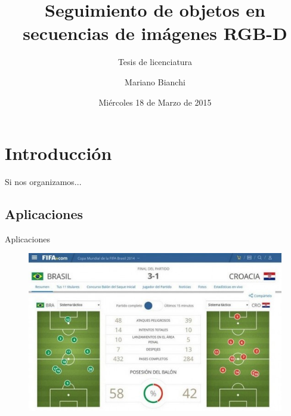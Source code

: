 \documentclass[]{beamer}
\title{Seguimiento de objetos en secuencias de imágenes RGB-D}
\subtitle{Tesis de licenciatura}
\institute{Facultad de Ciencias Exactas y Naturales}
\date[18/03/15]{Miércoles 18 de Marzo de 2015}
\author{Mariano Bianchi}
\begin{document}
\maketitle



\section{Introducción}
\begin{frame}[t]{Si nos organizamos...}
    \tableofcontents
\end{frame}

\subsection{Aplicaciones}
\begin{frame}{Aplicaciones} %


    \begin{figure}[t]
        \centering
        \includegraphics[scale=0.5]{img/estadistica.jpg}
    \end{figure}
\end{frame}
\end{document}
